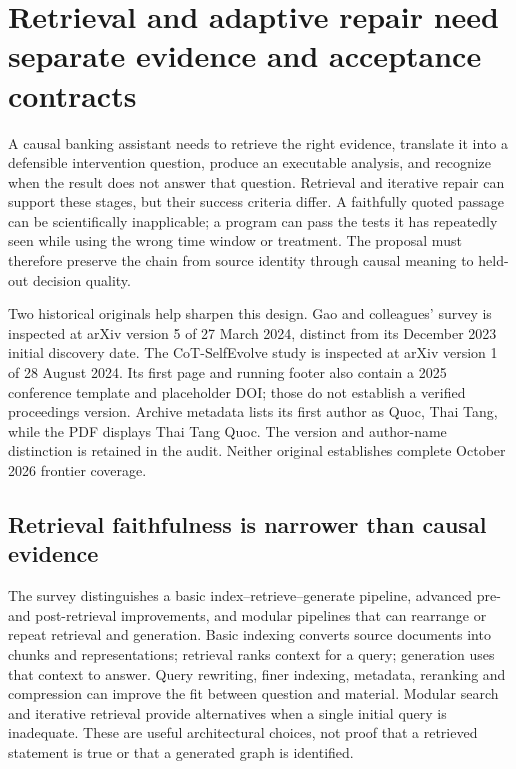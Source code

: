 \section{Retrieval and adaptive repair need separate evidence and acceptance contracts}
\label{exec19:ragrepair-scope}
A causal banking assistant needs to retrieve the right evidence, translate it
into a defensible intervention question, produce an executable analysis, and
recognize when the result does not answer that question. Retrieval and iterative
repair can support these stages, but their success criteria differ. A faithfully
quoted passage can be scientifically inapplicable; a program can pass the tests
it has repeatedly seen while using the wrong time window or treatment. The
proposal must therefore preserve the chain from source identity through causal
meaning to held-out decision quality.

Two historical originals help sharpen this design. Gao and colleagues' survey
is inspected at arXiv version 5 of 27 March 2024, distinct from its December 2023
initial discovery date. The CoT-SelfEvolve study is inspected at arXiv version 1
of 28 August 2024. Its first page and running footer also contain a 2025 conference
template and placeholder DOI; those do not establish a verified proceedings
version. Archive metadata lists its first author as Quoc, Thai Tang, while the
PDF displays Thai Tang Quoc. The version and author-name distinction is retained
in the audit. Neither original establishes complete October 2026 frontier coverage.
\citep{exec19_rag_survey,exec19_selfcorrection_study}

\subsection{Retrieval faithfulness is narrower than causal evidence}
\label{exec19:ragrepair-retrieval}
The survey distinguishes a basic index--retrieve--generate pipeline, advanced
pre- and post-retrieval improvements, and modular pipelines that can rearrange
or repeat retrieval and generation. Basic indexing converts source documents
into chunks and representations; retrieval ranks context for a query; generation
uses that context to answer. Query rewriting, finer indexing, metadata, reranking
and compression can improve the fit between question and material. Modular
search and iterative retrieval provide alternatives when a single initial
query is inadequate. These are useful architectural choices, not proof that a
retrieved statement is true or that a generated graph is identified.
\citep{exec19_rag_survey}

